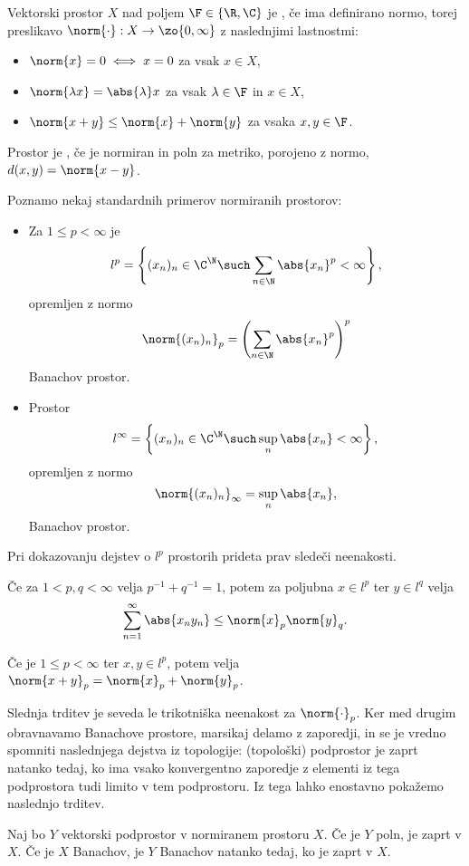 
Vektorski prostor $X$ nad poljem $\F \in \{\R, \C\}$ je , če ima
definirano normo, torej preslikavo $\norm{\cdot}: X \to \zo{0, \infty}$ z
naslednjimi lastnostmi:
\begin{itemize}
\item $\norm{x} = 0 \iff x = 0$ za vsak $x \in X$,
\item $\norm{\lambda x} = \abs{\lambda} x$ za vsak $\lambda \in \F$ in $x \in
  X$,
\item $\norm{x+y} \le \norm{x} + \norm{y}$ za vsaka $x, y \in \F$.
\end{itemize}
Prostor je , če je normiran in poln za metriko, porojeno z
normo, $d(x,y) = \norm{x-y}$.

Poznamo nekaj standardnih primerov normiranih prostorov:
\begin{itemize}
\item Za $1 \le p < \infty$ je
  \[
	l^p = \left\{ (x_n)_n \in \C^\N \such \sum_{n \in \N} \abs{x_n}^p < \infty
	\right\},
  \]
  opremljen z normo
  \[
	\norm{(x_n)_n}_p = \left( \sum_{n \in \N} \abs{x_n}^p \right)^p
  \]
  Banachov prostor.
\item Prostor
  \[
	l^\infty = \left\{ (x_n)_n \in \C^\N \such \sup_n \abs{x_n} < \infty \right\},
  \]
  opremljen z normo
  \[
	\norm{(x_n)_n}_\infty = \sup_n \abs{x_n},
  \]
  Banachov prostor.
\end{itemize}

Pri dokazovanju dejstev o $l^p$ prostorih prideta prav sledeči neenakosti.

\begin{trditev}
  Če za $1 < p, q < \infty$ velja $p^{-1} + q^{-1} = 1$, potem za poljubna $x
  \in l^p$ ter $y \in l^q$ velja
  \[
	\sum_{n=1}^\infty \abs{x_n y_n} \le \norm{x}_p \norm{y}_q.
  \]
\end{trditev}

\begin{trditev}[Minkowski]
  Če je $1 \le p < \infty$ ter $x, y \in l^p$, potem velja $\norm{x+y}_p =
  \norm{x}_p + \norm{y}_p$.
\end{trditev}

Slednja trditev je seveda le trikotniška neenakost za $\norm{\cdot}_p$.
Ker med drugim obravnavamo Banachove prostore, marsikaj delamo z zaporedji, in
se je vredno spomniti naslednjega dejstva iz topologije: (topološki) podprostor
je zaprt natanko tedaj, ko ima vsako konvergentno zaporedje z elementi iz tega
podprostora tudi limito v tem podprostoru.
Iz tega lahko enostavno pokažemo naslednjo trditev.

\begin{trditev}
  Naj bo $Y$ vektorski podprostor v normiranem prostoru $X$.
  Če je $Y$ poln, je zaprt v $X$.
  Če je $X$ Banachov, je $Y$ Banachov natanko tedaj, ko je zaprt v $X$.
\end{trditev}

